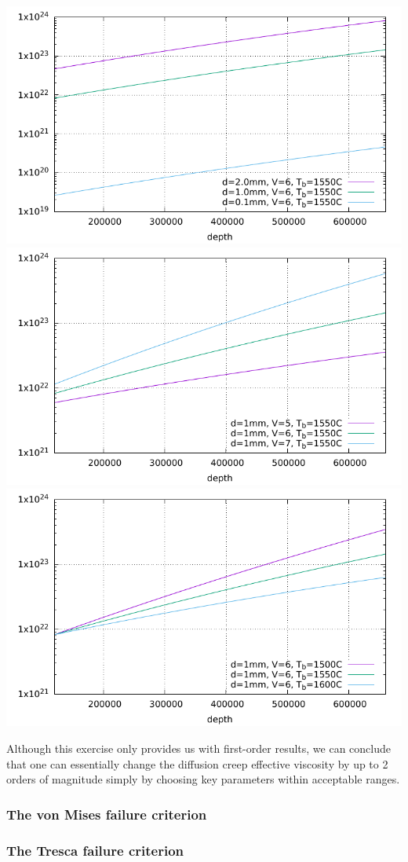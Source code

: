 \begin{center}
\includegraphics[width=5.cm]{images/rheology/kawudiff/viscosity1.pdf}
\includegraphics[width=5.cm]{images/rheology/kawudiff/viscosity2.pdf}
\includegraphics[width=5.cm]{images/rheology/kawudiff/viscosity3.pdf}
\end{center}

Although this exercise only provides us with first-order results, we can conclude that 
one can essentially change the diffusion creep effective viscosity by up to 2 orders of 
magnitude simply by choosing key parameters within acceptable ranges. 














\subsubsection{The von Mises failure criterion}\label{sec:vMcriterion}


\subsubsection{The Tresca failure criterion}


